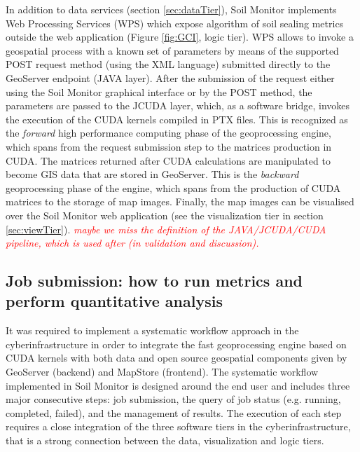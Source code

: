 \documentclass[APA,LATO1COL,doublespace]{WileyNJD-v2}
\newcommand{\toberevised}[1]{\emph{\textcolor{red}{#1}}} %
\begin{document}
In addition to data services (section \ref{sec:dataTier}), Soil Monitor implements Web Processing Services (WPS) which expose algorithm of soil sealing metrics outside the web application (Figure \ref{fig:GCI}, logic tier). 
WPS allows to invoke a geospatial process with a known set of parameters by means of the supported POST request method (using the XML language) submitted directly to the GeoServer endpoint (JAVA layer).
After the submission of the request either using the Soil Monitor graphical interface or by the POST method, the parameters are passed to the JCUDA layer, which, as a software bridge, invokes the execution of the CUDA kernels compiled in PTX files.
This is recognized as the \textit{forward} high performance computing phase of the geoprocessing engine, which spans from the request submission step to the matrices production in CUDA.
The matrices returned after CUDA calculations are manipulated to become GIS data that are stored in GeoServer.
This is the \textit{backward} geoprocessing phase of the engine, which spans from the production of CUDA matrices to the storage of map images.
Finally, the map images can be visualised over the Soil Monitor web application (see the visualization tier in section \ref{sec:viewTier}).
\toberevised{maybe we miss the definition of the JAVA/JCUDA/CUDA pipeline, which is used after (in validation and discussion).}

\subsection{Job submission: how to run metrics and perform quantitative analysis}
It was required to implement a systematic workflow approach in the cyberinfrastructure in order to integrate the fast geoprocessing engine based on CUDA kernels with both data and open source geospatial components given by GeoServer (backend) and MapStore (frontend). 
The systematic workflow implemented in Soil Monitor is designed around the end user and includes three major consecutive steps: job submission, the query of job status (e.g. running, completed, failed), and the management of results.
The execution of each step requires a close integration of the three software tiers in the cyberinfrastructure, that is a strong connection between the data, visualization and logic tiers. 
\end{document}
